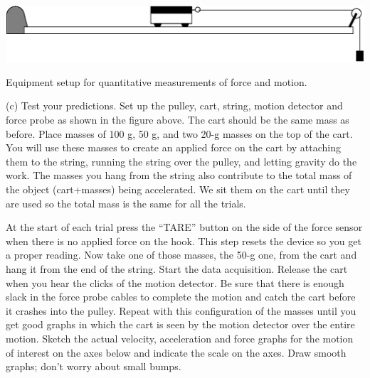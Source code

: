 \newpage

\begin{center}
\includegraphics{force1/force1_fig4.eps}

{Equipment setup for quantitative measurements of force and motion.}
\end{center}

(c) Test your predictions. Set up the pulley, cart, string, motion detector
and force probe as shown in the figure above. 
The cart should be the same mass as before. 
Place masses of 100 g, 50 g, and two 20-g masses on the top of the cart.
You will use these masses to create an applied force on the cart by attaching
them to the string, running the string over the pulley, and letting gravity do
the work.
The masses you hang from the string also contribute to the total mass of the 
object (cart+masses) being accelerated.
We sit them on the cart until they are used so the total mass is the same for all
the trials.

At the start of each trial press the ``TARE'' button on the side of the force sensor 
when there is no applied force on the hook.
This step resets the device so you get a proper reading.
Now take one of those masses, the 50-g one, from the cart and 
hang it from the end of the string. 
Start the data acquisition.
Release the cart when you hear the clicks of the motion detector. Be sure that
there is enough slack in the force probe cables to complete the motion and catch
the cart before it crashes into the pulley. Repeat with this configuration of the
masses until you get good graphs
in which the cart is seen by the motion detector over the entire motion. Sketch
the actual velocity, acceleration and force graphs for the motion of interest
on the axes below and indicate the scale on the axes. Draw smooth graphs; don't
worry about small bumps.

